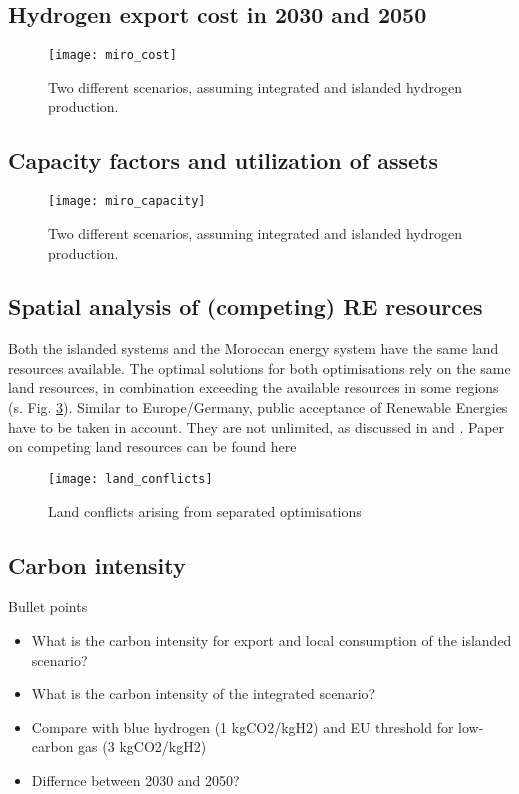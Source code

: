 \subsection{Hydrogen export cost in 2030 and 2050}

\begin{figure}[h!]
    \centering
    \texttt{[image: miro\_cost]}
    \caption{Two different scenarios, assuming integrated and islanded hydrogen production.}
    \label{fig:results_costs}
\end{figure}


\subsection{Capacity factors and utilization of assets}

\begin{figure}[h!]
    \centering
    \texttt{[image: miro\_capacity]}
    \caption{Two different scenarios, assuming integrated and islanded hydrogen production.}
    \label{fig:results_capacity}
\end{figure}

\subsection{Spatial analysis of (competing) RE resources}
Both the islanded systems and the Moroccan energy system have the same land resources available. 
The optimal solutions for both optimisations rely on the same land resources, in combination exceeding the 
available resources in some regions (s. Fig. \ref{fig:land_conflicts}). 
Similar to Europe/Germany, public acceptance of Renewable Energies have to be taken in account. 
They are not unlimited, as discussed in \cite{Hanger2016} and \cite{TerraponPfaff2019}.
Paper on competing land resources can be found here \cite{Patankar2022}

\begin{figure}[h!]
    \centering
    \texttt{[image: land\_conflicts]}
    \caption{Land conflicts arising from separated optimisations}
    \label{fig:land_conflicts}
\end{figure}


\subsection{Carbon intensity}
Bullet points
\begin{itemize}
    \item What is the carbon intensity for export and local consumption of the islanded scenario? 
    \item What is the carbon intensity of the integrated scenario?
    \item Compare with blue hydrogen (1 kgCO2/kgH2) and EU threshold for low-carbon gas (3 kgCO2/kgH2)
    \item Differnce between 2030 and 2050?
\end{itemize}



